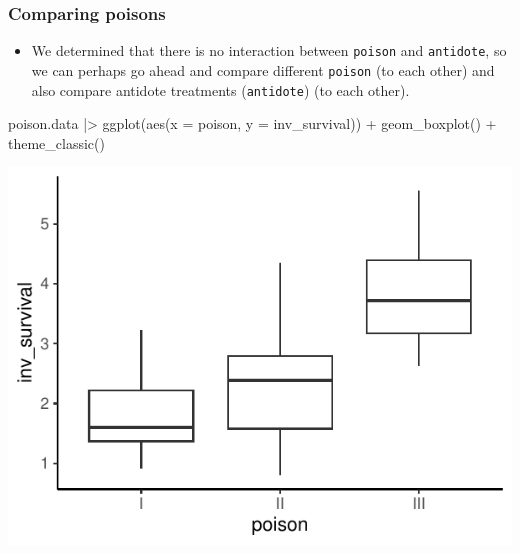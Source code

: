 \documentclass[a4paper]{article}
\begin{document}
\subsubsection{Comparing poisons}
\begin{itemize}
	\item We determined that there is no interaction between \lstinline|poison| and \lstinline|antidote|, so we can perhaps go ahead and compare different \lstinline|poison| (to each other) and also compare antidote treatments (\lstinline|antidote|) (to each other).
\end{itemize}
\begin{minipage}[t]{0.49\textwidth}
\begin{Schunk}
\begin{Sinput}
poison.data |> 
  ggplot(aes(x = poison, y = inv_survival)) +
  geom_boxplot() + 
  theme_classic()
\end{Sinput}


{\centering \includegraphics[width=\maxwidth]{figure/listings-unnamed-chunk-326-1} 

}

\end{Schunk}
\end{minipage}
\hspace{0.02\textwidth}
\end{document}

